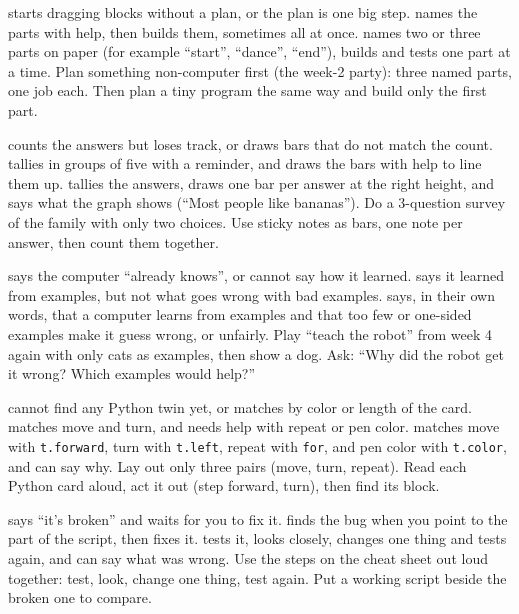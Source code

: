   {starts dragging blocks without a plan, or the plan is one big step.}
  {names the parts with help, then builds them, sometimes all at once.}
  {names two or three parts on paper (for example \enquote{start}, \enquote{dance}, \enquote{end}), builds and tests one part at a time.}
  {Plan something non-computer first (the week-2 party): three named parts, one job each. Then plan a tiny program the same way and build only the first part.}

  {counts the answers but loses track, or draws bars that do not match the count.}
  {tallies in groups of five with a reminder, and draws the bars with help to line them up.}
  {tallies the answers, draws one bar per answer at the right height, and says what the graph shows (\enquote{Most people like bananas}).}
  {Do a 3-question survey of the family with only two choices. Use sticky notes as bars, one note per answer, then count them together.}

  {says the computer \enquote{already knows}, or cannot say how it learned.}
  {says it learned from examples, but not what goes wrong with bad examples.}
  {says, in their own words, that a computer learns from examples and that too few or one-sided examples make it guess wrong, or unfairly.}
  {Play \enquote{teach the robot} from week 4 again with only cats as examples, then show a dog. Ask: \enquote{Why did the robot get it wrong? Which examples would help?}}

  {cannot find any Python twin yet, or matches by color or length of the card.}
  {matches move and turn, and needs help with repeat or pen color.}
  {matches move with \texttt{t.forward}, turn with \texttt{t.left}, repeat with \texttt{for}, and pen color with \texttt{t.color}, and can say why.}
  {Lay out only three pairs (move, turn, repeat). Read each Python card aloud, act it out (step forward, turn), then find its block.}

  {says \enquote{it's broken} and waits for you to fix it.}
  {finds the bug when you point to the part of the script, then fixes it.}
  {tests it, looks closely, changes one thing and tests again, and can say what was wrong.}
  {Use the steps on the cheat sheet out loud together: test, look, change one thing, test again. Put a working script beside the broken one to compare.}


